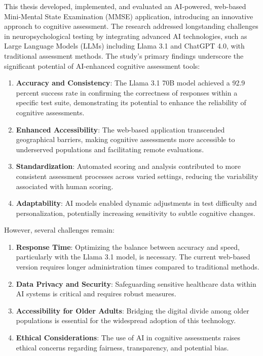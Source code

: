 This thesis developed, implemented, and evaluated an AI-powered, web-based Mini-Mental State Examination (MMSE) application, introducing an innovative approach to cognitive assessment. The research addressed longstanding challenges in neuropsychological testing by integrating advanced AI technologies, such as Large Language Models (LLMs) including Llama 3.1 and ChatGPT 4.0, with traditional assessment methods.
The study's primary findings underscore the significant potential of AI-enhanced cognitive assessment tools:
\begin{enumerate}
\item \textbf{Accuracy and Consistency}: The Llama 3.1 70B model achieved a 92.9 percent success rate in confirming the correctness of responses within a specific test suite, demonstrating its potential to enhance the reliability of cognitive assessments.
\item \textbf{Enhanced Accessibility}: The web-based application transcended geographical barriers, making cognitive assessments more accessible to underserved populations and facilitating remote evaluations.
\item \textbf{Standardization}: Automated scoring and analysis contributed to more consistent assessment processes across varied settings, reducing the variability associated with human scoring.
\item \textbf{Adaptability}: AI models enabled dynamic adjustments in test difficulty and personalization, potentially increasing sensitivity to subtle cognitive changes.
\end{enumerate}
However, several challenges remain:
\begin{enumerate}
\item \textbf{Response Time}: Optimizing the balance between accuracy and speed, particularly with the Llama 3.1 model, is necessary. The current web-based version requires longer administration times compared to traditional methods.
\item \textbf{Data Privacy and Security}: Safeguarding sensitive healthcare data within AI systems is critical and requires robust measures.
\item \textbf{Accessibility for Older Adults}: Bridging the digital divide among older populations is essential for the widespread adoption of this technology.
\item \textbf{Ethical Considerations}: The use of AI in cognitive assessments raises ethical concerns regarding fairness, transparency, and potential bias.
\end{enumerate}
